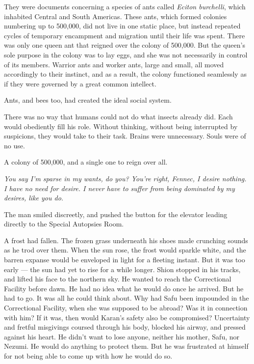 They were documents concerning a species of ants called \emph{Eciton
burchelli}, which inhabited Central and South Americas. These ants, which
formed colonies numbering up to 500,000, did not live in one static
place, but instead repeated cycles of temporary encampment and migration
until their life was spent. There was only one queen ant that reigned
over the colony of 500,000. But the queen's sole purpose in the colony
was to lay eggs, and she was not necessarily in control of its members.
Warrior ants and worker ants, large and small, all moved accordingly to
their instinct, and as a result, the colony functioned seamlessly as if
they were governed by a great common intellect.

Ants, and bees too, had created the ideal social system.

There was no way that humans could not do what insects already did. Each
would obediently fill his role. Without thinking, without being
interrupted by suspicions, they would take to their task. Brains were
unnecessary. Souls were of no use.

A colony of 500,000, and a single one to reign over all.

\emph{You say I'm sparse in my wants, do you? You're right, Fennec, I desire
nothing. I have no need for desire. I never have to suffer from being
dominated by my desires, like you do.}

The man smiled discreetly, and pushed the button for the elevator
leading directly to the Special Autopsies Room.

\mybreak

A frost had fallen. The frozen grass underneath his shoes made crunching
sounds as he trod over them. When the sun rose, the frost would sparkle
white, and the barren expanse would be enveloped in light for a fleeting
instant. But it was too early --- the sun had yet to rise for a while
longer. Shion stopped in his tracks, and lifted his face to the northern
sky. He wanted to reach the Correctional Facility before dawn. He had no
idea what he would do once he arrived. But he had to go. It was all he
could think about. Why had Safu been impounded in the Correctional
Facility, when she was supposed to be abroad? Was it in connection with
him? If it was, then would Karan's safety also be compromised?
Uncertainty and fretful misgivings coursed through his body, blocked his
airway, and pressed against his heart. He didn't want to lose anyone,
neither his mother, Safu, nor Nezumi. He would do anything to protect
them. But he was frustrated at himself for not being able to come up
with how he would do so.

